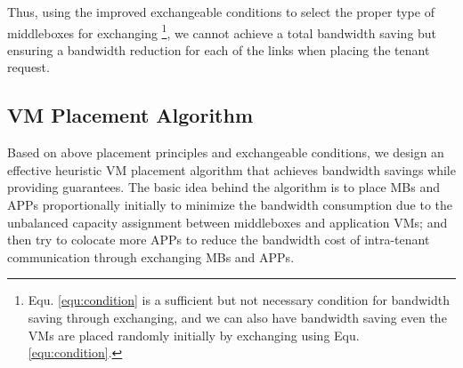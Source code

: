 \documentclass[review]{elsarticle}
\begin{document}
Thus, using the improved exchangeable conditions to select the proper type of middleboxes for exchanging \footnote{Equ. \ref{equ:condition} is a sufficient but not necessary condition for bandwidth saving through exchanging, and we can also have bandwidth saving even the VMs are placed randomly initially by exchanging using Equ. \ref{equ:condition}.},
we cannot achieve a total bandwidth saving but ensuring a bandwidth reduction for each of the links when placing the tenant request.


\subsection{VM Placement Algorithm}

Based on above placement principles and exchangeable conditions, we design an effective heuristic VM placement algorithm that achieves bandwidth savings while providing guarantees. The basic idea behind the algorithm is to place MBs and APPs proportionally initially to minimize the bandwidth consumption due to the unbalanced capacity assignment between middleboxes and application VMs; and then try to colocate more APPs to reduce the bandwidth cost of intra-tenant communication through exchanging MBs and APPs. 
\end{document}
